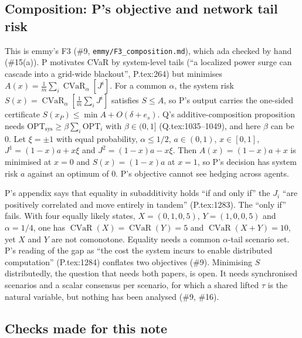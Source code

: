 \documentclass{article}
\newcommand{\CVaR}{\operatorname{CVaR}}
\begin{document}
\subsection{Composition: P's objective and network tail
risk}\label{sec:comp}

This is emmy's F3 (\#9, \texttt{emmy/F3\_composition.md}), which ada
checked by hand (\#15(a)). P motivates CVaR by system-level tails (``a
localized power surge can cascade into a grid-wide blackout'',
P.tex:264) but minimises $A(x)=\frac1m\sum_i\CVaR_\alpha[J^i]$. For a
common $\alpha$, the system risk $S(x)=\CVaR_\alpha[\frac1m\sum_iJ^i]$
satisfies $S\le A$, so P's output carries the one-sided certificate
$S(x_P)\le\min A+O(\delta+e_s)$. Q's additive-composition proposition
needs $\mathrm{OPT}_{\mathrm{sys}}\ge\beta\sum_i\mathrm{OPT}_i$ with
$\beta\in(0,1]$ (Q.tex:1035--1049), and here $\beta$ can be $0$. Let
$\xi=\pm1$ with equal probability, $\alpha\le1/2$, $a\in(0,1)$,
$x\in[0,1]$, $J^1=(1-x)a+x\xi$ and $J^2=(1-x)a-x\xi$. Then
$A(x)=(1-x)a+x$ is minimised at $x=0$ and $S(x)=(1-x)a$ at $x=1$, so P's
decision has system risk $a$ against an optimum of $0$. P's objective
cannot see hedging across agents.

P's appendix says that equality in subadditivity holds ``if and only if''
the $J_i$ ``are positively correlated and move entirely in tandem''
(P.tex:1283). The ``only if'' fails. With four equally likely states,
$X=(0,1,0,5)$, $Y=(1,0,0,5)$ and $\alpha=1/4$, one has
$\CVaR(X)=\CVaR(Y)=5$ and $\CVaR(X+Y)=10$, yet $X$ and $Y$ are not
comonotone. Equality needs a common $\alpha$-tail scenario set. P's
reading of the gap as ``the cost the system incurs to enable distributed
computation'' (P.tex:1284) conflates two objectives (\#9). Minimising $S$
distributedly, the question that needs both papers, is open. It needs
synchronised scenarios and a scalar consensus per scenario, for which a
shared lifted $\tau$ is the natural variable, but nothing has been
analysed (\#9, \#16).

\subsection{Checks made for this note}\label{sec:checks}
\end{document}
